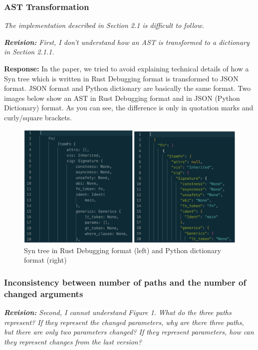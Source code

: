 \documentclass{article}
\begin{document}
\subsubsection{\label{rev:2:ast}AST Transformation}

\textit{The implementation described in Section 2.1 is difficult to follow.}

\textit{\textbf{Revision:} First, I don't understand how an AST is transformed to a dictionary in Section 2.1.1.}

\textbf{Response:} In the paper, we tried to avoid explaining technical details of how a Syn tree which is written in Rust Debugging format is transformed to JSON format. JSON format and Python dictionary are basically the same format. Two images below show an AST in Rust Debugging format and in JSON (Python Dictionary) format. As you can see, the difference is only in quotation marks and curly/square brackets.

\begin{figure}[h]
    \centering
    \includegraphics[width=1\textwidth]{astpics}
    \caption{Syn tree in Rust Debugging format (left) and Python dictionary format (right)}
\end{figure}

\subsubsection{\label{rev:2:path}Inconsistency between number of paths and the number of changed arguments}

\textit{\textbf{Revision:} Second, I cannot understand Figure 1. What do the three paths represent? If they represent the changed parameters, why are there three paths, but there are only two parameters changed? If they represent parameters, how can they represent changes from the last version?}
\end{document}
